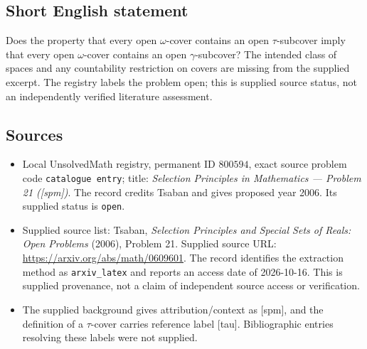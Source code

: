 \documentclass[11pt]{article}
\begin{document}
\subsection{Short English statement}
Does the property that every open \(\omega\)-cover contains an open \(\tau\)-subcover imply that every open \(\omega\)-cover contains an open \(\gamma\)-subcover? The intended class of spaces and any countability restriction on covers are missing from the supplied excerpt. The registry labels the problem open; this is supplied source status, not an independently verified literature assessment.
\subsection{Sources}
\begin{itemize}
\item Local UnsolvedMath registry, permanent ID \(800594\), exact source problem code \texttt{catalogue entry}; title: \emph{Selection Principles in Mathematics --- Problem 21 ([spm])}. The record credits Tsaban and gives proposed year 2006. Its supplied status is \texttt{open}.
\item Supplied source list: Tsaban, \emph{Selection Principles and Special Sets of Reals: Open Problems} (2006), Problem 21. Supplied source URL: \url{https://arxiv.org/abs/math/0609601}. The record identifies the extraction method as \texttt{arxiv\_latex} and reports an access date of 2026-10-16. This is supplied provenance, not a claim of independent source access or verification.
\item The supplied background gives attribution/context as [spm], and the definition of a \(\tau\)-cover carries reference label [tau]. Bibliographic entries resolving these labels were not supplied.
\end{itemize}
\end{document}
